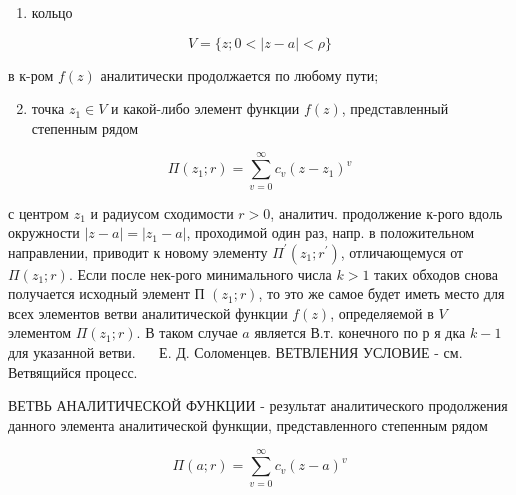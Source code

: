 \documentclass[10pt]{article}
\begin{document}
\begin{enumerate}

  \item кольцо

\end{enumerate}



\[

V=\{z ; 0<|z-a|<\rho\}

\]



в к-ром $f(z)$ аналитически продолжается по любому пути;



\begin{enumerate}

  \setcounter{enumi}{1}

  \item точка $z_{1} \in V$ и какой-либо элемент функции $f(z)$, представленный степенным рядом

\end{enumerate}



\[

\Pi\left(z_{1} ; r\right)=\sum_{v=0}^{\infty} c_{v}\left(z-z_{1}\right)^{v}

\]



с центром $z_{1}$ и радиусом сходимости $r>0$, аналитич. продолжение к-рого вдоль окружности $|z-a|=\left|z_{1}-a\right|$, проходимой один раз, напр. в положительном направлении, приводит к новому элементу $\Pi^{\prime}\left(z_{1} ; r^{\prime}\right)$, отличающемуся от $\Pi\left(z_{1} ; r\right)$. Если после нек-рого минимального числа $k>1$ таких обходов снова получается исходный элемент П $\left(z_{1} ; r\right)$, то это же самое будет иметь место для всех элементов ветви аналитической функции $f(z)$, определяемой в $V$ элементом $\Pi\left(z_{1} ; r\right)$. В таком случае $a$ является В.т. конечного по р я дка $k-1$ для указанной ветви. $\quad$ Е. Д. Соломенцев. ВЕТВЛЕНИЯ УСЛОВИЕ - см. Ветвящийся процесс.



ВЕТВЬ АНАЛИТИЧЕСКОЙ ФУНКЦИИ - результат аналитического продолжения данного элемента аналитической функщии, представленного степенным рядом



\[

\Pi(a ; r)=\sum_{v=0}^{\infty} c_{v}(z-a)^{v}

\]
\end{document}
